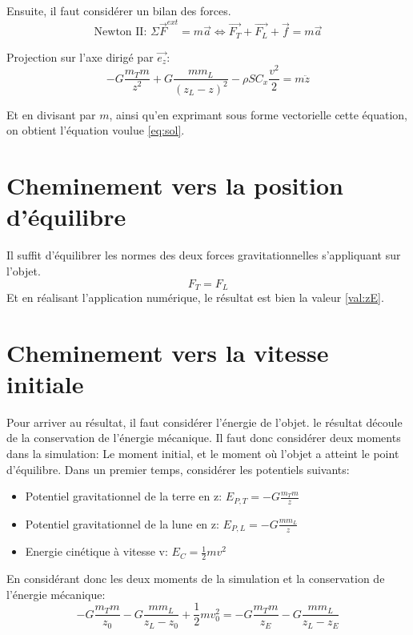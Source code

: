 \documentclass[a4paper,12pt,twoside]{article}
\begin{document}
Ensuite, il faut considérer un bilan des forces.
\begin{equation}
	\text{Newton II: }\Sigma\vec{F}^{ext} = m\vec{a} \Leftrightarrow \vec{F_T} + \vec{F_L} + \vec{f} = m\vec{a}
\end{equation}

Projection sur l'axe dirigé par $\vec{e_z}$:
\begin{equation}
	-G\frac{m_T m}{z^2} + G\frac{m m_L }{(z_L-z)^2} - \rho S C_x \frac{v^2}{2} = m\ddot{z}
\end{equation}

Et en divisant par $m$, ainsi qu'en exprimant sous forme vectorielle cette équation, on obtient l'équation voulue \ref{eq:sol}.

\section{Cheminement vers la position d'équilibre}
Il suffit d'équilibrer les normes des deux forces gravitationnelles s'appliquant sur l'objet.
\begin{equation}
	F_T = F_L
\end{equation}
Et en réalisant l'application numérique, le résultat est bien la valeur \ref{val:zE}.


\section{Cheminement vers la vitesse initiale}
Pour arriver au résultat, il faut considérer l'énergie de l'objet.
le résultat découle de la conservation de l'énergie mécanique.
Il faut donc considérer deux moments dans la simulation: Le moment initial, et le moment où l'objet a atteint le point d'équilibre.
Dans un premier temps, considérer les potentiels suivants:
\begin{itemize}
	\item Potentiel gravitationnel de la terre en z: $E_{P,T} = -G\frac{m_T m}{z}$
	\item Potentiel gravitationnel de la lune en z: $E_{P,L} = -G\frac{m m_L}{z}$
	\item Energie cinétique à vitesse v: $E_C = \frac{1}{2}mv^2$
\end{itemize}

En considérant donc les deux moments de la simulation et la conservation de l'énergie mécanique:
\begin{equation}
	-G\frac{m_T m}{z_0} - G\frac{m m_L}{z_L - z_0} + \frac{1}{2}mv_0^2 = -G\frac{m_T m}{z_E} - G\frac{m m_L}{z_L - z_E}
\end{equation}
\end{document}
